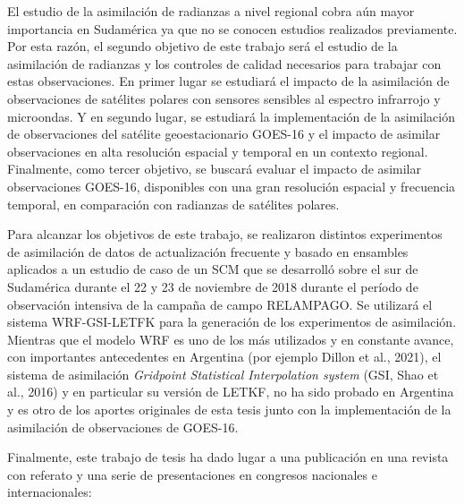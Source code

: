 \documentclass[12pt,oneside,a4paper]{reedthesis}
\begin{document}
El estudio de la asimilación de radianzas a nivel regional cobra aún mayor importancia en Sudamérica ya que no se conocen estudios realizados previamente. Por esta razón, el segundo objetivo de este trabajo será el estudio de la asimilación de radianzas y los controles de calidad necesarios para trabajar con estas observaciones. En primer lugar se estudiará el impacto de la asimilación de observaciones de satélites polares con sensores sensibles al espectro infrarrojo y microondas. Y en segundo lugar, se estudiará la implementación de la asimilación de observaciones del satélite geoestacionario GOES-16 y el impacto de asimilar observaciones en alta resolución espacial y temporal en un contexto regional. Finalmente, como tercer objetivo, se buscará evaluar el impacto de asimilar observaciones GOES-16, disponibles con una gran resolución espacial y frecuencia temporal, en comparación con radianzas de satélites polares.

Para alcanzar los objetivos de este trabajo, se realizaron distintos experimentos de asimilación de datos de actualización frecuente y basado en ensambles aplicados a un estudio de caso de un SCM que se desarrolló sobre el sur de Sudamérica durante el 22 y 23 de noviembre de 2018 durante el período de observación intensiva de la campaña de campo RELAMPAGO. Se utilizará el sistema WRF-GSI-LETFK para la generación de los experimentos de asimilación. Mientras que el modelo WRF es uno de los más utilizados y en constante avance, con importantes antecedentes en Argentina (por ejemplo Dillon et al., 2021), el sistema de asimilación \emph{Gridpoint Statistical Interpolation system} (GSI, Shao et al., 2016) y en particular su versión de LETKF, no ha sido probado en Argentina y es otro de los aportes originales de esta tesis junto con la implementación de la asimilación de observaciones de GOES-16.

Finalmente, este trabajo de tesis ha dado lugar a una publicación en una revista con referato y una serie de presentaciones en congresos nacionales e internacionales:
\end{document}
